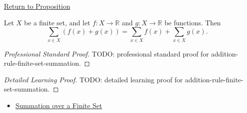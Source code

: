 \newpage
{}
\label{prf:addition-rule-finite-set-summation}

\begin{remark*}[Return]
\hyperref[prop:addition-rule-finite-set-summation]{Return to Proposition}
\end{remark*}

\begin{proposition*}
Let \(X\) be a finite set, and let \(f:X\to\mathbb{R}\) and
\(g:X\to\mathbb{R}\) be functions. Then
\[
  \sum_{x\in X} (f(x)+g(x))
  =
  \sum_{x\in X} f(x)
  +
  \sum_{x\in X} g(x).
\]
\end{proposition*}

\begin{proof}[Professional Standard Proof]
\LRAProofBodyStart
TODO: professional standard proof for addition-rule-finite-set-summation.
\end{proof}

\begin{proof}[Detailed Learning Proof]
\LRAProofBodyStart
TODO: detailed learning proof for addition-rule-finite-set-summation.
\end{proof}

\begin{remark*}
\end{remark*}

\begin{dependencies}
\begin{itemize}
  \item \hyperref[def:summation-over-finite-set]{Summation over a Finite Set}
\end{itemize}
\end{dependencies}

\clearpage
